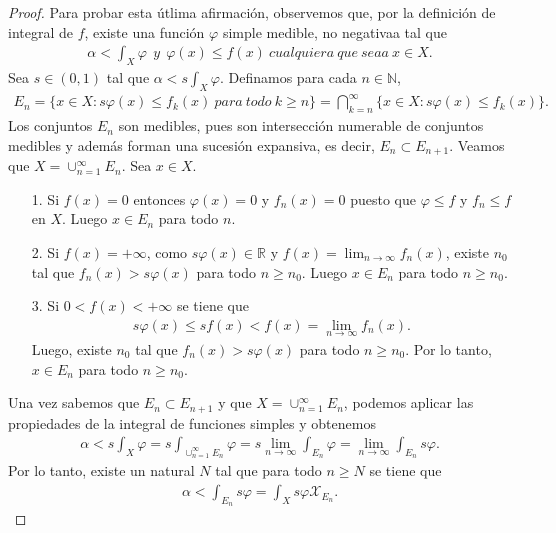 \begin{proof}
    Para probar esta útlima afirmación, observemos que, por la definición de integral de $f$, existe una función $\varphi$ simple medible, no negativaa tal que
    \begin{align*}
        \alpha < \int_{X}{\varphi} \ \ y \ \ \varphi(x) \leq  f(x) \ cualquiera \ que \ seaa \ x \in X.
    \end{align*}
    Sea $s \in (0,1)$ tal que $\alpha < s\int_{X}{\varphi}$. Definamos para cada $n \in \mathbb{N}$,
    \begin{align*}
        E_n = \{ x \in X : s\varphi(x) \leq f_k(x) \ para \ todo \ k \ge n \} = \bigcap_{k=n}^{\infty}{\{ x \in X : s\varphi(x) \leq f_k(x)\}}.
    \end{align*}
    Los conjuntos $E_n$ son medibles, pues son intersección numerable de conjuntos medibles y además forman una sucesión expansiva, es decir, $E_n \subset E_{n+1}$. Veamos que $X = \cup_{n=1}^{\infty}{E_n}$. Sea $x \in X$.
    \begin{enumerate}
        \item[1.] Si $f(x) = 0$ entonces $\varphi(x) = 0$ y $f_n(x) = 0$ puesto que $\varphi \leq f$ y $f_n \leq f$ en $X$. Luego $x \in E_n$ para todo $n$.
        \item[2.] Si $f(x) = +\infty$, como $s\varphi(x) \in \mathbb{R}$ y $f(x) = \lim_{n \to \infty}{f_n(x)}$, existe $n_0$ tal que $f_n(x) > s\varphi(x)$ para todo $n \ge n_0$. Luego $x \in E_n$ para todo $n \ge n_0$.
        \item[3.] Si $0 < f(x) < +\infty$ se tiene que
              \begin{align*}
                  s\varphi(x) \leq sf(x) < f(x) = \lim_{n \to \infty}{f_n(x)}.
              \end{align*}
              Luego, existe $n_0$ tal que $f_n(x) > s\varphi(x)$ para todo $n \ge n_0$. Por lo tanto, $x \in E_n$ para todo $n \ge n_0$.
    \end{enumerate}
    Una vez sabemos que $E_n \subset E_{n+1}$ y que $X = \cup_{n=1}^{\infty}{E_n}$, podemos aplicar las propiedades de la integral de funciones simples y obtenemos
    \begin{align*}
        \alpha < s\int_{X}{\varphi} = s\int_{\cup_{n=1}^{\infty}{E_n}}{\varphi} = s\lim_{n \to \infty}{\int_{E_n}{\varphi}} = \lim_{n \to \infty}{\int_{E_n}{s\varphi}}.
    \end{align*}
    Por lo tanto, existe un natural $N$ tal que para todo $n \ge N$ se tiene que
    \begin{align*}
        \alpha < \int_{E_n}{s\varphi} = \int_{X}{s\varphi\mathcal{X}_{E_n}}.

\end{align*}
\end{proof}
